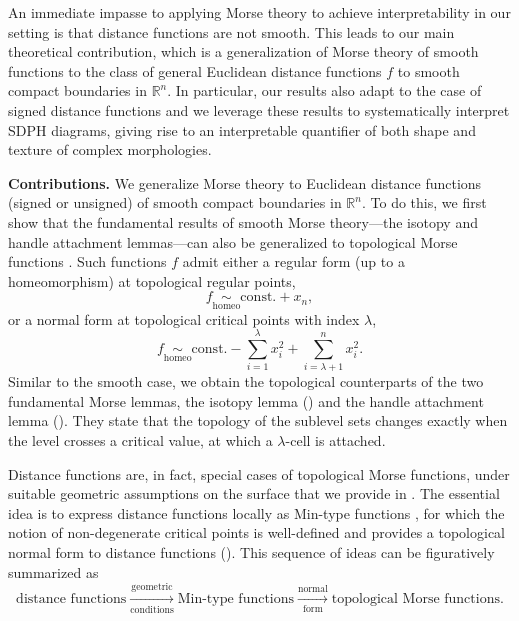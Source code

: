 \documentclass[11pt]{article}
\newcommand{\R}{\mathbb{R}}
\theoremstyle{plain}
\theoremstyle{definition}
\theoremstyle{remark}
\begin{document}
	An immediate impasse to applying Morse theory to achieve interpretability in our setting is that distance functions are not smooth.  This leads to our main theoretical contribution, which is a generalization of Morse theory of smooth functions to the class of general Euclidean distance functions $f$ to smooth compact boundaries in $\mathbb{R}^n$.  In particular, our results also adapt to the case of signed distance functions and we leverage these results to systematically interpret SDPH diagrams, giving rise to an interpretable quantifier of both shape and texture of complex morphologies.
	
	
	\textbf{Contributions.}
	We generalize Morse theory to Euclidean distance functions (signed or unsigned) of smooth compact boundaries in $\R^n$. 
	To do this, we first show that the fundamental results of smooth Morse theory---the isotopy and handle attachment lemmas---can also be generalized to topological Morse functions \citep{morse_topologically_1959}. Such functions $f$ admit either a regular form (up to a homeomorphism) at topological regular points,
	\[f \underset{\mathrm{homeo}}{\sim} \mathrm{const.} + x_n,\] 
	or a normal form at topological critical points with index $\lambda$,
	\[ f \underset{\mathrm{homeo}}{\sim} \mathrm{const.} - \sum_{i = 1}^{\lambda} x_i^2 + \sum_{i = \lambda + 1}^{n} x_i^2.\]
	Similar to the smooth case, we obtain the topological counterparts of the two fundamental Morse lemmas, the isotopy lemma () and the handle attachment lemma (). They state that the topology of the sublevel sets changes exactly when the level crosses a critical value, at which a $\lambda$-cell is attached.
	
	
	Distance functions are, in fact, special cases of topological Morse functions, under suitable geometric assumptions on the surface that we provide in . The essential idea is to express distance functions locally as Min-type functions \citep{gershkovich_morse_1997}, for which the notion of non-degenerate critical points is well-defined and provides a topological normal form to distance functions (). This sequence of ideas can be figuratively summarized as
	\[\text{distance functions} \xrightarrow[\text{conditions}]{\text{geometric}} \text{Min-type functions} \xrightarrow[\text{form}]{\text{normal}} \text{topological Morse functions}.\]
	
\end{document}
